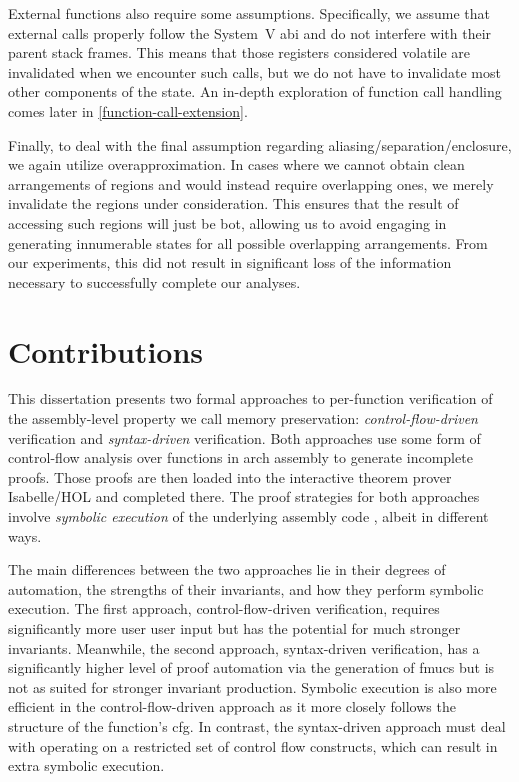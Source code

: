 External functions also require some assumptions.
Specifically, we assume that external calls properly follow the System~V \ac{abi} and do not interfere with their parent stack frames.
This means that those registers considered volatile are invalidated when we encounter such calls, but we do not have to invalidate most other components of the state.
An in-depth exploration of function call handling comes later in \cref{function-call-extension}.

Finally, to deal with the final assumption regarding aliasing/separation/enclosure, we again utilize overapproximation.
In cases where we cannot obtain clean arrangements of regions and would instead require overlapping ones, we merely invalidate the regions under consideration.
This ensures that the result of accessing such regions will just be \gls{bot}, allowing us to avoid engaging in generating innumerable states for all possible overlapping arrangements.
From our experiments, this did not result in significant loss of the information necessary to successfully complete our analyses.


\section{Contributions}
This dissertation presents two formal approaches to per-function verification
of the assembly-level property we call memory preservation:
\emph{control-flow-driven} verification and \emph{syntax-driven} verification.
Both approaches use some form of control-flow analysis over functions in \gls{arch} assembly to generate incomplete proofs.
Those proofs are then loaded into the interactive theorem prover Isabelle/HOL
and completed there. The proof strategies for both approaches involve
\emph{symbolic execution} of the underlying assembly code \autocite{king1976symbolic}, albeit in different ways.

The main differences between the two approaches
lie in their degrees of automation, the strengths of their invariants,
and how they perform symbolic execution.
The first approach, control-flow-driven verification,
requires significantly more user user input but has the potential for much stronger invariants.
Meanwhile, the second approach, syntax-driven verification,
has a significantly higher level of proof automation via the generation of \acp{fmuc}
but is not as suited for stronger invariant production.
Symbolic execution is also more efficient in the control-flow-driven approach
as it more closely follows the structure of the function's \ac{cfg}.
In contrast, the syntax-driven approach must deal with
operating on a restricted set of control flow constructs,
which can result in extra symbolic execution.

